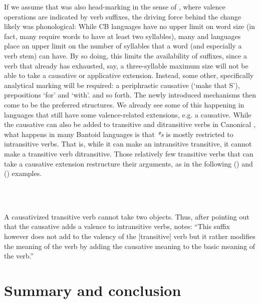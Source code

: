 \documentclass[output=paper]{langsci/langscibook}
\begin{document}
If we assume that  was also head-marking in the sense of \citet{Nichols1986}, where valence operations are indicated by verb suffixes, the driving force behind the change likely was phonological: While CB languages have no upper limit on word size (in fact, many require words to have at least two syllables), many  and  languages place an upper limit on the number of syllables that a word (and especially a verb stem) can have. By so doing, this limits the availability of suffixes, since a verb that already has exhausted, say, a three-syllable maximum size will not be able to take a causative or applicative extension. Instead, some other, specifically analytical marking will be required: a periphrastic causative (‘make that S’), prepositions ‘for’ and ‘with’. and so forth. The newly introduced mechanisms then come to be the preferred structures. We already see some of this happening in languages that still have some valence-related extensions, e.g. a causative. While the causative can also be added to transitive and ditransitive verbs in Canonical , what happens in many Bantoid languages is that \textit{*s} is mostly restricted to intransitive verbs. That is, while it can make an intransitive transitive, it cannot make a transitive verb ditransitive. Those relatively few transitive verbs that can take a causative extension restructure their arguments, as in the following  () and  () examples.
 
\ea%
\ea 
{} \\
 \ex 
 \\
\z
\z

\noindent
A causativized transitive verb cannot take two objects. Thus, after pointing out that the causative adds a valence to intransitive verbs, \citet[102]{Bila1986} notes: “This suffix however does not add to the valency of the [transitive] verb but it rather modifies the meaning of the verb by adding the causative meaning to the basic meaning of the verb.” 

\section{Summary and conclusion}
\end{document}
